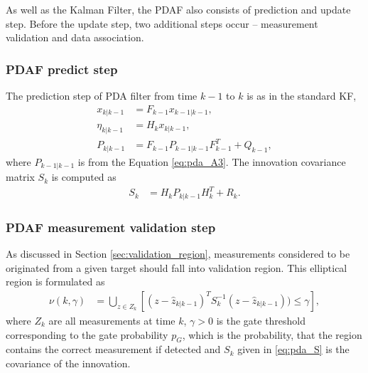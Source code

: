 As well as the Kalman Filter, the PDAF also consists of prediction and update step. Before the update step, two
additional steps occur -- measurement validation and data association.
 \subsubsection{PDAF predict step}
The prediction step of PDA filter from time $k-1$ to $k$ is as in the standard KF,
\begin{align}
    x_{k|k-1} &= F_{k-1}x_{k-1|k-1},\\
    \eta_{k|k-1} &= H_k x_{k|k-1},\\
    P_{k|k-1} &= F_{k-1} P_{k-1|k-1} F_{k-1}^T + Q_{k-1},
\end{align}
where $P_{k-1|k-1}$ is from the Equation \eqref{eq:pda_A3}. The innovation covariance matrix $S_k$ is computed as
\begin{align}
    S_k &= H_{k} P_{k|k-1} H_{k}^T + R_{k}. \label{eq:pda_S}
\end{align}

\subsubsection{PDAF measurement validation step}
As discussed in Section \ref{sec:validation_region}, measurements considered to be originated from a given target
should fall into validation region. This elliptical region is formulated as
\begin{align}
    \nu(k,\gamma) &= \bigcup_{z \in Z_k}[(z - \hat{z}_{k|k-1})^T S_k^{-1} (z - \hat{z}_{k|k-1})) \leq \gamma], \label {eq:validation_region}
\end{align}
where $Z_k$ are all measurements at time $k$, $\gamma>0$ is the gate threshold corresponding to the gate probability $
p_G$, which is the probability, that the region contains the correct measurement if detected and $S_k$ given in \eqref{eq:pda_S} is the covariance of the innovation.

